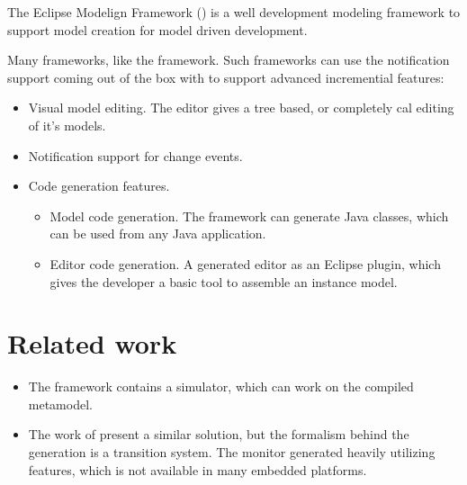 The Eclipse Modelign Framework (\emf) is a well development modeling framework to support model creation for model driven development.

Many frameworks, like the \viatra{} framework. Such frameworks can use the notification support coming out of the box with \emf{} to support advanced incremential features:
\begin{itemize}
	\item Visual model editing. The \emf{} editor gives a tree based, or completely cal editing of it's models.
	\item Notification support for change events.
	\item Code generation features.
	      \begin{itemize}
	      	\item Model code generation. The framework can generate Java classes, which can be used from any Java application.
	      	\item Editor code generation. A generated editor as an Eclipse plugin, which gives the developer a basic tool to assemble an instance model.
	      \end{itemize}
\end{itemize}

\section{Related work}

\begin{itemize}
	\item The \viatrac{} framework contains a simulator, which can work on the compiled metamodel.
	\item The work of \cite{TDK2015} present a similar solution, but the formalism behind the generation is a transition system. The monitor generated heavily utilizing  features, which is not available in many embedded platforms.

\end{itemize}
